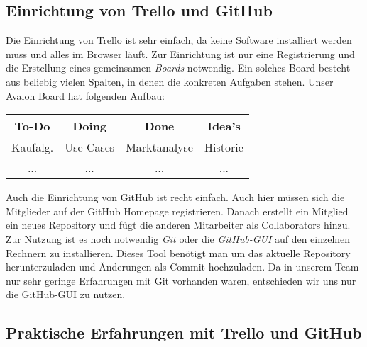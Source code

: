 \subsection{Einrichtung von Trello und GitHub}
 Die Einrichtung von Trello ist sehr einfach, da keine Software installiert werden muss und alles im Browser läuft. Zur Einrichtung ist nur eine Registrierung und die Erstellung eines gemeinsamen \textit{Boards} notwendig. Ein solches Board besteht aus beliebig vielen Spalten, in denen die konkreten Aufgaben stehen. Unser Avalon Board hat folgenden Aufbau:\\
\begin{center}
\begin{tabular}{|c|c|c|c|}\hline
  \textbf{ To-Do} & \textbf{Doing} & \textbf{Done} & \textbf{Idea's} \\ \hline
   Kaufalg. & Use-Cases & Marktanalyse & Historie \\ \hline
   ... & ... & ... & ...\\ \hline
 \end{tabular}
\end{center}
Auch die Einrichtung von GitHub ist recht einfach. Auch hier müssen sich die Mitglieder auf der GitHub Homepage registrieren. Danach erstellt ein Mitglied ein neues Repository und fügt die anderen Mitarbeiter als Collaborators hinzu. Zur Nutzung ist es noch notwendig \textit{Git} oder die \textit{GitHub-GUI} auf den einzelnen Rechnern zu installieren. Dieses Tool benötigt man um das aktuelle Repository herunterzuladen und Änderungen als Commit hochzuladen. Da in unserem Team nur sehr geringe Erfahrungen mit Git vorhanden waren, entschieden wir uns nur die GitHub-GUI zu nutzen.

\subsection{Praktische Erfahrungen mit Trello und GitHub}

